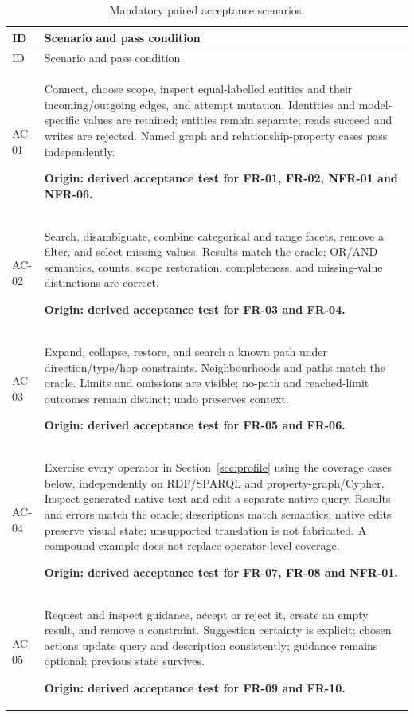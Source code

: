 \documentclass[11pt,a4paper]{article}
\begin{document}
{\small
\begin{longtable}{@{}P{1.35cm}P{14.35cm}@{}}
\caption{Mandatory paired acceptance scenarios.}\label{tab:ac}\\
\toprule ID & Scenario and pass condition\\\midrule
\endfirsthead\toprule ID & Scenario and pass condition\\\midrule\endhead
\bottomrule\endlastfoot
AC-01 & Connect, choose scope, inspect equal-labelled entities and their incoming/outgoing edges, and attempt mutation. Identities and model-specific values are retained; entities remain separate; reads succeed and writes are rejected. Named graph and relationship-property cases pass independently.\par\smallskip \textbf{Origin: derived acceptance test for FR-01, FR-02, NFR-01 and NFR-06.}\\
AC-02 & Search, disambiguate, combine categorical and range facets, remove a filter, and select missing values. Results match the oracle; OR/AND semantics, counts, scope restoration, completeness, and missing-value distinctions are correct.\par\smallskip \textbf{Origin: derived acceptance test for FR-03 and FR-04.}\\
AC-03 & Expand, collapse, restore, and search a known path under direction/type/hop constraints. Neighbourhoods and paths match the oracle. Limits and omissions are visible; no-path and reached-limit outcomes remain distinct; undo preserves context.\par\smallskip \textbf{Origin: derived acceptance test for FR-05 and FR-06.}\\
AC-04 & Exercise every operator in Section~\ref{sec:profile} using the coverage cases below, independently on RDF/SPARQL and property-graph/Cypher. Inspect generated native text and edit a separate native query. Results and errors match the oracle; descriptions match semantics; native edits preserve visual state; unsupported translation is not fabricated. A compound example does not replace operator-level coverage.\par\smallskip \textbf{Origin: derived acceptance test for FR-07, FR-08 and NFR-01.}\\
AC-05 & Request and inspect guidance, accept or reject it, create an empty result, and remove a constraint. Suggestion certainty is explicit; chosen actions update query and description consistently; guidance remains optional; previous state survives.\par\smallskip \textbf{Origin: derived acceptance test for FR-09 and FR-10.}\\

\end{longtable}}
\end{document}
